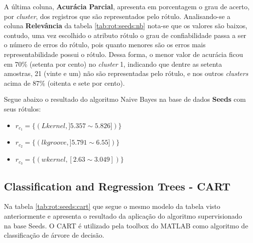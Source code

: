 A última coluna, \textbf{Acurácia Parcial}, apresenta em porcentagem o grau de acerto, por \textit{cluster}, dos registros que são representados pelo rótulo. Analisando-se a coluna \textbf{Relevância} da tabela \ref{tab:rot:seeds:nb} nota-se que os valores são baixos, contudo, uma vez escolhido o atributo rótulo o grau de confiabilidade passa a ser o número de erros do rótulo, pois quanto menores são os erros mais representabilidade possui o rótulo. Dessa forma, o menor valor de acurácia ficou em 70\% (setenta por cento) no \textit{cluster} 1, indicando que dentre as setenta amostras, 21 (vinte e um) não são representadas pelo rótulo, e nos outros \textit{clusters} acima de 87\% (oitenta e sete por cento).

Segue abaixo o resultado do algoritmo Naive Bayes na base de dados \textbf{Seeds} com seus rótulos: 
\begin{itemize}[noitemsep]
 \item ${r_{c_1}=\{ (Lkernel, ] 5.357 \sim  5.826 ]) \} }$  
 \item ${r_{c_2}=\{ (lkgroove, ] 5.791 \sim  6.55]) \} }$
 \item ${r_{c_3}=\{ (wkernel, [2.63 \sim  3.049])\} }$
\end{itemize}


\subsection{Classification and Regression Trees - CART}\label{cap:resultados:ssec:seed:cart}

Na tabela \ref{tab:rot:seeds:cart} que segue o mesmo modelo da tabela visto anteriormente e apresenta o resultado da aplicação do algoritmo supervisionado na base Seeds. O CART é utilizado pela toolbox do MATLAB como algoritmo de classificação de árvore de decisão. 

